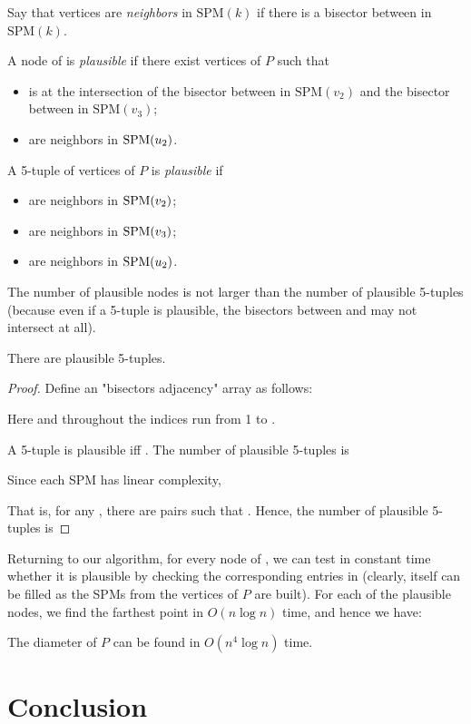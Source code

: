 \documentclass{llncs}
\newcommand{\e}[1]{\emph{#1}}
\renewcommand\-{\textrm{-}}
\renewcommand{\O}[1]{\ensuremath{O(#1 \log n)}\xspace}
\renewcommand\P{\ensuremath{P}\xspace}
\newcommand{\spm}[1]{\ensuremath{\textrm{SPM}(#1)}\xspace}
\begin{document}
Say that vertices  are \e{neighbors} in \spm{k} if there is a bisector between  in \spm{k}.
\begin{definition} A node  of  is \e{plausible} if there exist vertices  of \P such that
\begin{itemize}
\item  is at the intersection of the bisector between  in \spm{v_2} and the bisector between  in \spm{v_3};
\item  are neighbors in \spm\utwo. \end{itemize}\end{definition}
\begin{definition} A 5-tuple  of vertices of \P is \e{plausible} if
\begin{itemize}
\item  are neighbors in \spm\vtwo; \item  are neighbors in \spm\vthree; \item  are neighbors in \spm\utwo. \end{itemize}\end{definition}
The number of plausible nodes is not larger than the number of plausible 5-tuples (because even if a 5-tuple is plausible, the bisectors between  and  may not intersect at all).
\begin{lemma}There are  plausible 5-tuples.\end{lemma}
\begin{proof} Define an  "bisectors adjacency" array  as follows:

Here and throughout the indices run from 1 to . 

A 5-tuple  is plausible iff . 
The number of plausible 5-tuples is

Since each SPM has linear complexity,

That is, for any , there are  pairs  such that . Hence, the number of plausible 5-tuples is

\end{proof}
Returning to our algorithm, for every node of , we can test in constant time whether it is plausible by checking the corresponding entries in  (clearly,  itself can be filled as the SPMs from the vertices of \P are built). For each of the  plausible nodes, we find the farthest point in \O{n} time, and hence we have:
\begin{theorem}The diameter of \P can be found in \O{n^{4}} time.\end{theorem}

\section{Conclusion}
\end{document}
